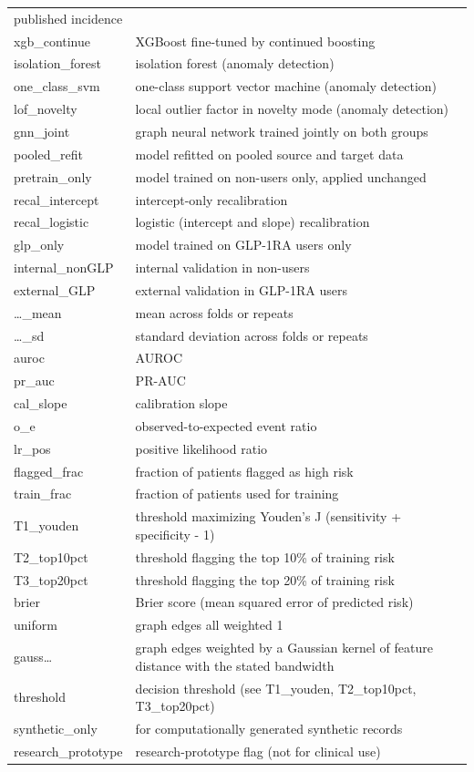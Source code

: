 \documentclass[
  11pt,
]{article}
\begin{document}
\begin{longtable}[]{@{}
  >{\raggedright\arraybackslash}p{}
  >{\raggedright\arraybackslash}p{}@{}}
published incidence \\
xgb\_continue & XGBoost fine-tuned by continued boosting \\
isolation\_forest & isolation forest (anomaly detection) \\
one\_class\_svm & one-class support vector machine (anomaly
detection) \\
lof\_novelty & local outlier factor in novelty mode (anomaly
detection) \\
gnn\_joint & graph neural network trained jointly on both groups \\
pooled\_refit & model refitted on pooled source and target data \\
pretrain\_only & model trained on non-users only, applied unchanged \\
recal\_intercept & intercept-only recalibration \\
recal\_logistic & logistic (intercept and slope) recalibration \\
glp\_only & model trained on GLP-1RA users only \\
internal\_nonGLP & internal validation in non-users \\
external\_GLP & external validation in GLP-1RA users \\
\ldots\_mean & mean across folds or repeats \\
\ldots\_sd & standard deviation across folds or repeats \\
auroc & AUROC \\
pr\_auc & PR-AUC \\
cal\_slope & calibration slope \\
o\_e & observed-to-expected event ratio \\
lr\_pos & positive likelihood ratio \\
flagged\_frac & fraction of patients flagged as high risk \\
train\_frac & fraction of patients used for training \\
T1\_youden & threshold maximizing Youden's J (sensitivity + specificity
- 1) \\
T2\_top10pct & threshold flagging the top 10\% of training risk \\
T3\_top20pct & threshold flagging the top 20\% of training risk \\
brier & Brier score (mean squared error of predicted risk) \\
uniform & graph edges all weighted 1 \\
gauss\ldots{} & graph edges weighted by a Gaussian kernel of feature
distance with the stated bandwidth \\
threshold & decision threshold (see T1\_youden, T2\_top10pct,
T3\_top20pct) \\
synthetic\_only & 1 for computationally generated synthetic records \\
research\_prototype & research-prototype flag (not for clinical use) \\
\end{longtable}
\end{document}

